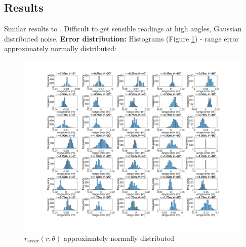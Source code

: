 	\subsection{Results}
	Similar results to \cite{park2010characterization}. Difficult to get sensible readings at high angles, Gaussian distributed noise.
		\textbf{Error distribution:}
		Histograms (Figure \ref{fig:mean_hist}) - range error approximately normally distributed:
		\begin{figure}
		\centering
		  \includegraphics[width=1\textwidth,trim = 0mm 0mm 0mm 0mm,clip]{./Figures/range_error_histograms.jpg}
		  \caption{$r_{error}(r,\theta)$ approximately normally distributed}
		  \label{fig:mean_hist}
		\end{figure}
		
